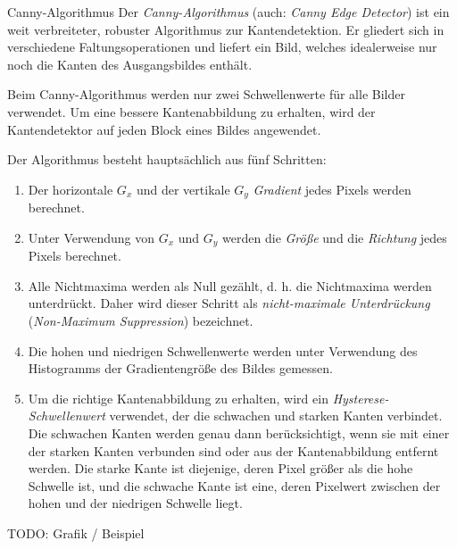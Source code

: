 \begin{defi}[Kantendetektor]{Canny-Algorithmus}
    Der \emph{Canny-Algorithmus} (auch: \emph{Canny Edge Detector}) ist ein weit verbreiteter, robuster Algorithmus zur Kantendetektion. Er gliedert sich in verschiedene Faltungsoperationen und liefert ein Bild, welches idealerweise nur noch die Kanten des Ausgangsbildes enthält.

    Beim Canny-Algorithmus werden nur zwei Schwellenwerte für alle Bilder verwendet.
    Um eine bessere Kantenabbildung zu erhalten, wird der Kantendetektor auf jeden Block eines Bildes angewendet.

    Der Algorithmus besteht hauptsächlich aus fünf Schritten:
    \begin{enumerate}
        \item Der horizontale $G_{x}$ und der vertikale $G_{y}$ \emph{Gradient} jedes Pixels werden berechnet.
        \item Unter Verwendung von $G_{x}$ und $G_{y}$ werden die \emph{Größe} und die \emph{Richtung} jedes Pixels berechnet.
        \item Alle Nichtmaxima werden als Null gezählt, d. h. die Nichtmaxima werden unterdrückt. Daher wird dieser Schritt als \emph{nicht-maximale Unterdrückung} (\emph{Non-Maximum Suppression}) bezeichnet.
        \item Die hohen und niedrigen Schwellenwerte werden unter Verwendung des Histogramms der Gradientengröße des Bildes gemessen.
        \item Um die richtige Kantenabbildung zu erhalten, wird ein \emph{Hysterese-Schwellenwert} verwendet, der die schwachen und starken Kanten verbindet.
              Die schwachen Kanten werden genau dann berücksichtigt, wenn sie mit einer der starken Kanten verbunden sind oder aus der Kantenabbildung entfernt werden.
              Die starke Kante ist diejenige, deren Pixel größer als die hohe Schwelle ist, und die schwache Kante ist eine, deren Pixelwert zwischen der hohen und der niedrigen Schwelle liegt.
    \end{enumerate}

    TODO: Grafik / Beispiel
\end{defi}